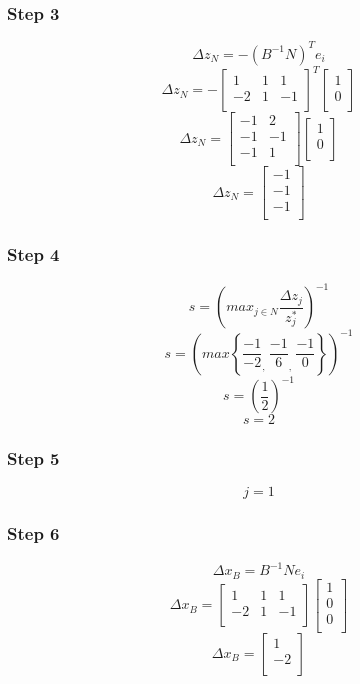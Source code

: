 \documentclass[14pt]{extarticle}
\begin{document}
\subsubsection*{Step 3}
\[
    \Delta z_N = -(B^{-1}N)^T e_i
\]
\[
    \Delta z_N =
    -\begin{bmatrix}
        1 & 1 & 1 \\
        -2 & 1 & -1 \\
    \end{bmatrix}^T
    \begin{bmatrix}
        1 \\
        0 \\
    \end{bmatrix}
\]
\[
    \Delta z_N = 
    \begin{bmatrix}
        -1 & 2 \\
        -1 & -1 \\
        -1 & 1 \\
    \end{bmatrix}
    \begin{bmatrix}
        1 \\
        0 \\
    \end{bmatrix}
\]
\[
    \Delta z_N = 
    \begin{bmatrix}
        -1 \\
        -1 \\
        -1 \\
    \end{bmatrix}
\]

\subsubsection*{Step 4}
\[
    s = \left(max_{j \in N} \frac{\Delta z_j}{z^*_j}\right)^{-1}
\]
\[
    s = \left(max \left\{ \frac{-1}{-2}_{\textstyle,}\ \frac{-1}{6}_{\textstyle,}\ \frac{-1}{0} \right\} \right)^{-1}
\]
\[
    s = \left(\frac{1}{2}\right)^{-1}
\]
\[
    s = 2
\]

\subsubsection*{Step 5}
\[
    j = 1
\]

\subsubsection*{Step 6}
\[
    \Delta x_B = B^{-1}N e_i
\]
\[
    \Delta x_B =
    \begin{bmatrix}
        1 & 1 & 1 \\
        -2 & 1 & -1 \\
    \end{bmatrix}
    \begin{bmatrix}
        1 \\
        0 \\
        0 \\
    \end{bmatrix}
\]
\[
    \Delta x_B =
    \begin{bmatrix}
        1 \\
        -2 \\
    \end{bmatrix}
\]
\end{document}
